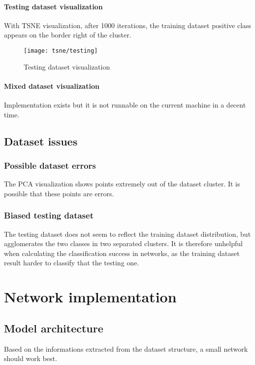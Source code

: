 \subsection{Testing dataset visualization}
With TSNE visualization, after 1000 iterations, the training dataset positive class appears on the border right of the cluster.

\begin{figure}
	\texttt{[image: tsne/testing]}
	\caption{Testing dataset visualization}
\end{figure}

\subsection{Mixed dataset visualization}
Implementation exists but it is not runnable on the current machine in a decent time.

\chapter{Dataset issues}

\section{Possible dataset errors}
The PCA visualization shows points extremely out of the dataset cluster. It is possible that these points are errors.

\section{Biased testing dataset}
The testing dataset does not seem to reflect the training dataset distribution, but agglomerates the two classes in two separated clusters. It is therefore unhelpful when calculating the classification success in networks, as the training dataset result harder to classify that the testing one.

\part{Network implementation}
\chapter{Model architecture}
Based on the informations extracted from the dataset structure, a small network should work best.

